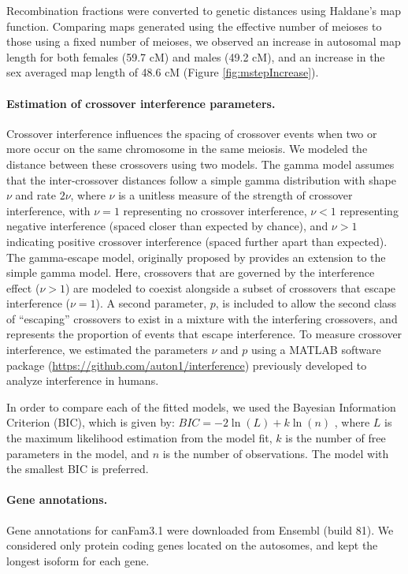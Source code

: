 Recombination fractions were converted to genetic distances using Haldane's map function.
Comparing maps generated using the effective number of meioses to those using a fixed number of meioses, we observed an increase in autosomal map length for both females (59.7 cM) and males (49.2 cM), and an increase in the sex averaged map length of 48.6 cM (Figure \ref{fig:mstepIncrease}).

\paragraph{Estimation of crossover interference parameters.}
Crossover interference influences the spacing of crossover events when two or more occur on the same chromosome in the same meiosis.
We modeled the distance between these crossovers using two models.
The gamma model\cite{Broman2000} assumes that the inter-crossover distances follow a simple gamma distribution with shape $\nu$ and rate $2\nu$, where $\nu$ is a unitless measure of the strength of crossover interference,
with $\nu=1$ representing no crossover interference, $\nu<1$ representing negative interference (spaced closer than expected by chance), and $\nu>1$ indicating positive crossover interference (spaced further apart than expected).
The gamma-escape model, originally proposed by \citet{Housworth2003} provides an extension to the simple gamma model.
Here, crossovers that are governed by the interference effect ($\nu>1$) are modeled to coexist alongside a subset of crossovers that escape interference ($\nu=1$).
A second parameter, $p$, is included to allow the second class of ``escaping'' crossovers to exist in a mixture with the interfering crossovers, and represents the proportion of events that escape interference.
To measure crossover interference, we estimated the parameters $\nu$ and $p$ using a MATLAB software package (\url{https://github.com/auton1/interference}) previously developed to analyze interference in humans\cite{Campbell2015}.

In order to compare each of the fitted models, we used the Bayesian Information Criterion (BIC), which is given by:
$BIC = -2 \ln( L ) + k \ln( n )$
, where $L$ is the maximum likelihood estimation from the model fit, $k$ is the number of free parameters in the model, and $n$ is the number of observations.
The model with the smallest BIC is preferred.

\paragraph{Gene annotations.}
Gene annotations for canFam3.1 were downloaded from Ensembl (build 81).
We considered only protein coding genes located on the autosomes, and kept the longest isoform for each gene.

